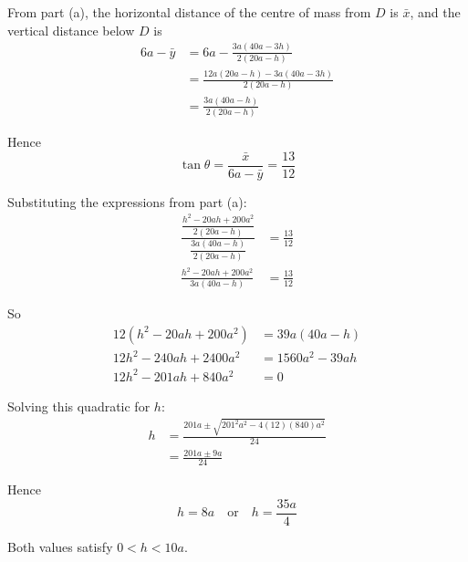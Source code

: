 \documentclass[leqno]{article}
\begin{document}
\begin{enumerate}[
  label=\textbf{\arabic*.},
  leftmargin=*,
  topsep=0pt,
  partopsep=0pt,
  parsep=0pt
]
\begin{djsSolution}
\begin{enumerate}[label=\textbf{(\alph*)}, start=1]
  From part (a), the horizontal distance of the centre of mass from $D$ is $\bar x$, and the vertical distance below $D$ is
  \begin{align*}
  6a-\bar y
  &=6a-\frac{3a(40a-3h)}{2(20a-h)} \\
  &=\frac{12a(20a-h)-3a(40a-3h)}{2(20a-h)} \\
  &=\frac{3a(40a-h)}{2(20a-h)}
  \end{align*}

  Hence
  \[
  \tan\theta=\frac{\bar x}{6a-\bar y}=\frac{13}{12}
  \]

  Substituting the expressions from part (a):
  \begin{align*}
  \frac{\dfrac{h^2-20ah+200a^2}{2(20a-h)}}{\dfrac{3a(40a-h)}{2(20a-h)}}
  &=\frac{13}{12} \\
  \frac{h^2-20ah+200a^2}{3a(40a-h)}
  &=\frac{13}{12}
  \end{align*}

  So
  \begin{align*}
  12(h^2-20ah+200a^2)&=39a(40a-h) \\
  12h^2-240ah+2400a^2&=1560a^2-39ah \\
  12h^2-201ah+840a^2&=0
  \end{align*}

  Solving this quadratic for $h$:
  \begin{align*}
  h
  &=\frac{201a\pm\sqrt{201^2a^2-4(12)(840)a^2}}{24} \\
  &=\frac{201a\pm 9a}{24}
  \end{align*}

  Hence
  \[
  h=8a \quad \text{or} \quad h=\frac{35a}{4}
  \]

  Both values satisfy $0<h<10a$.
\end{enumerate}
\end{djsSolution}


\newpage

\questionitem

\begin{figure}[H]
    \centering
{}
\end{figure}
\end{enumerate}
\end{document}
